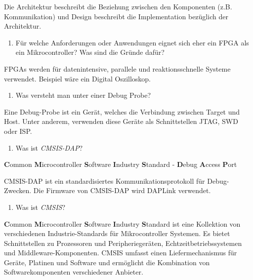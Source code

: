 \documentclass[
  10pt,
  a4paper,
]{article}
\providecommand{\tightlist}{%
  \setlength{\itemsep}{0pt}\setlength{\parskip}{0pt}}\usepackage{longtable,booktabs,array}
\numberwithin{equation}{section}
\begin{document}
Die Architektur beschreibt die Beziehung zwischen den Komponenten (z.B.
Kommunikation) und Design beschreibt die Implementation bezüglich der
Architektur.

\begin{enumerate}
\def\labelenumi{\arabic{enumi}.}
\setcounter{enumi}{9}
\tightlist
\item
  Für welche Anforderungen oder Anwendungen eignet sich eher ein FPGA
  als ein Mikrocontroller? Was sind die Gründe dafür?
\end{enumerate}

FPGAs werden für datenintensive, parallele und reaktionsschnelle Systeme
verwendet. Beispiel wäre ein Digital Oszilloskop.

\begin{enumerate}
\def\labelenumi{\arabic{enumi}.}
\setcounter{enumi}{8}
\tightlist
\item
  Was versteht man unter einer Debug Probe?
\end{enumerate}

Eine Debug-Probe ist ein Gerät, welches die Verbindung zwischen Target
und Host. Unter anderem, verwenden diese Geräte als Schnittstellen JTAG,
SWD oder ISP.

\begin{enumerate}
\def\labelenumi{\arabic{enumi}.}
\setcounter{enumi}{11}
\tightlist
\item
  Was ist \emph{CMSIS-DAP}?
\end{enumerate}

\textbf{C}ommon \textbf{M}icrocontroller \textbf{S}oftware
\textbf{I}ndustry \textbf{S}tandard - \textbf{D}ebug \textbf{A}ccess
\textbf{P}ort

CMSIS-DAP ist ein standardisiertes Kommunikationsprotokoll für
Debug-Zwecken. Die Firmware von CMSIS-DAP wird DAPLink verwendet.

\begin{enumerate}
\def\labelenumi{\arabic{enumi}.}
\setcounter{enumi}{12}
\tightlist
\item
  Was ist \emph{CMSIS}?
\end{enumerate}

\textbf{C}ommon \textbf{M}icrocontroller \textbf{S}oftware
\textbf{I}ndustry \textbf{S}tandard ist eine Kollektion von
verschiedenen Industrie-Standards für Mikrocontroller Systemen. Es
bietet Schnittstellen zu Prozessoren und Peripheriegeräten,
Echtzeitbetriebssystemen und Middleware-Komponenten. CMSIS umfasst einen
Liefermechanismus für Geräte, Platinen und Software und ermöglicht die
Kombination von Softwarekomponenten verschiedener Anbieter.
\end{document}
